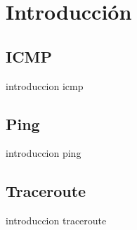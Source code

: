 \section{Introducción}

\subsection{ICMP}

introduccion icmp

\subsection{Ping}

introduccion ping

\subsection{Traceroute}

introduccion traceroute